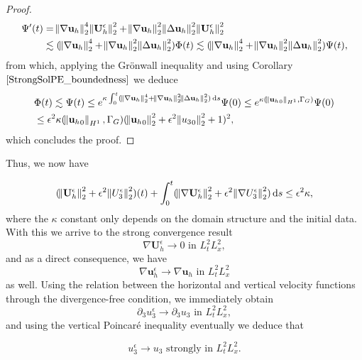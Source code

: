 \documentclass[11pt]{article}
\newcommand*\diff{\mathop{}\!\mathrm{d}}
\begin{document}
\begin{proof}
\begin{equation}
\begin{split} \nonumber
\Psi'(t) & = \norm{\nabla \mathbf{u}_h}_2^4 \norm{\mathbf{U}_h^\epsilon}_2^2 + \norm{\nabla \mathbf{u}_h}_2^2 \norm{\Delta \mathbf{u}_h}_2^2 \norm{\mathbf{U}_h^\epsilon}_2^2 \\
& \lesssim (\norm{\nabla \mathbf{u}_h}_2^4 + \norm{\nabla \mathbf{u}_h}_2^2 \norm{\Delta \mathbf{u}_h}_2^2) \Phi (t) \lesssim (\norm{\nabla \mathbf{u}_h}_2^4 + \norm{\nabla \mathbf{u}_h}_2^2 \norm{\Delta \mathbf{u}_h}_2^2)\Psi(t),
\end{split}
\end{equation}
%
from which, applying the Gr\"onwall inequality and using Corollary $\ref{StrongSolPE_boundedness}$ we deduce
%
\begin{equation}
\begin{split} \nonumber
& \Phi (t) \lesssim \Psi (t) \leq e^{\kappa \int_0 ^ t (\norm{\nabla \mathbf{u}_h}_2^4 + \norm{\nabla \mathbf{u}_h}_2^2 \norm{\Delta \mathbf{u}_h}_2^2) \diff s} \Psi (0) \leq e^{\kappa(\norm{{\mathbf{u}_h}_0}_{H^1}, \Gamma_G)} \Psi(0) \\
& \leq \epsilon^2 \kappa (\norm{{\mathbf{u}_h}_0}_{H^1}, \Gamma_G) (\norm{{\mathbf{u}_h}_0}_2^2 + \epsilon^2 \norm{{u_3}_0}_2^2 + 1)^2,
\end{split}
\end{equation}
%
which concludes the proof.

\end{proof}

Thus, we now have

$$ (\norm{\mathbf{U}_h^\epsilon}_2^2 + \epsilon^2 \norm{U_3^\epsilon}_2^2)(t) + \int_0^t (\norm{\nabla \mathbf{U}_h^\epsilon}_2^2 + \epsilon^2 \norm{\nabla U_3^\epsilon}_2^2) \diff s \leq \epsilon^2 \kappa,$$
%
where the $\kappa$ constant only depends on the domain structure and the initial data. With this we arrive to the strong convergence result $$\nabla \mathbf{U}_h^\epsilon \to 0 \text{ in } L^2_t L^2_x,$$ and as a direct consequence, we have $$\nabla \mathbf{u}_h^\epsilon \to \nabla \mathbf{u}_h \text{ in } L^2_t L^2_x$$ as well. Using the relation between the horizontal and vertical velocity functions through the divergence-free condition, we immediately obtain $$\partial_3 u_3^\epsilon \to \partial_3 u_3 \text{ in } L^2_t L^2_x,$$ and using the vertical Poincar\'e inequality eventually we deduce that

\begin{equation}\label{strongconvresultu3}u_3^\epsilon \to u_3 \text{ strongly in } L^2_t L^2_x.\end{equation}
\end{document}

